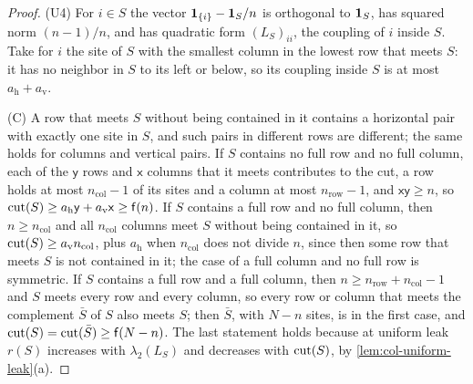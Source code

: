 \begin{proof}
(U4) For $i\in S$ the vector $\mathbf{1}_{\{i\}}-\mathbf{1}_S/n$ is orthogonal to $\mathbf{1}_S$, has squared norm $(n-1)/n$, and has quadratic form $(L_S)_{ii}$, the coupling of $i$ inside $S$. Take for $i$ the site of $S$ with the smallest column in the lowest row that meets $S$: it has no neighbor in $S$ to its left or below, so its coupling inside $S$ is at most $a_{\mathrm h}+a_{\mathrm v}$.

(C) A row that meets $S$ without being contained in it contains a horizontal pair with exactly one site in $S$, and such pairs in different rows are different; the same holds for columns and vertical pairs. If $S$ contains no full row and no full column, each of the $\mathsf y$ rows and $\mathsf x$ columns that it meets contributes to the cut, a row holds at most $n_{\mathrm{col}}-1$ of its sites and a column at most $n_{\mathrm{row}}-1$, and $\mathsf x\mathsf y\ge n$, so $\operatorname{cut}(S)\ge a_{\mathrm h}\mathsf y+a_{\mathrm v}\mathsf x\ge\mathsf f(n)$. If $S$ contains a full row and no full column, then $n\ge n_{\mathrm{col}}$ and all $n_{\mathrm{col}}$ columns meet $S$ without being contained in it, so $\operatorname{cut}(S)\ge a_{\mathrm v}n_{\mathrm{col}}$, plus $a_{\mathrm h}$ when $n_{\mathrm{col}}$ does not divide $n$, since then some row that meets $S$ is not contained in it; the case of a full column and no full row is symmetric. If $S$ contains a full row and a full column, then $n\ge n_{\mathrm{row}}+n_{\mathrm{col}}-1$ and $S$ meets every row and every column, so every row or column that meets the complement $\bar S$ of $S$ also meets $S$; then $\bar S$, with $N-n$ sites, is in the first case, and $\operatorname{cut}(S)=\operatorname{cut}(\bar S)\ge\mathsf f(N-n)$. The last statement holds because at uniform leak $r(S)$ increases with $\lambda_2(L_S)$ and decreases with $\operatorname{cut}(S)$, by \cref{lem:col-uniform-leak}(a).
\end{proof}

